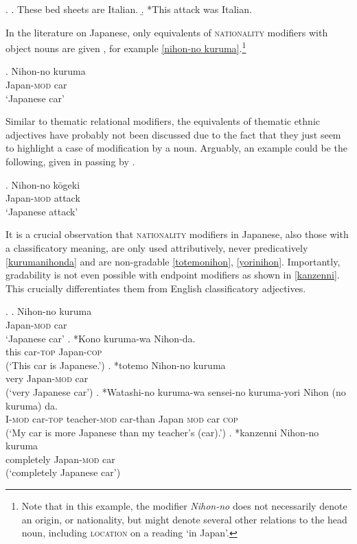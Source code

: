 \ex. \a. These bed sheets are Italian. \label{bedsheet}
\b. *This attack was Italian. \label{attack}

In the literature on Japanese, only equivalents of \textsc{nationality} modifiers with object nouns are given \citep{morita:2011:three, nagano:2016:are}, for example \ref{nihon-no kuruma}.\footnote{Note that in this example, the modifier \textit{Nihon-no} does not necessarily denote an origin, or nationality, but might denote several other relations to the head noun, including \textsc{location} on a reading `in Japan’.}

\exg. Nihon-no kuruma\\
Japan-\textsc{mod} car\\
`Japanese car' \label{nihon-no kuruma}

Similar to thematic relational modifiers, the equivalents of thematic ethnic adjectives have probably not been discussed due to the fact that they just seem to highlight a case of modification by a noun. Arguably, an example could be the following, given in passing by \citet[48]{nagano:2016:are}. 

\exg. Nihon-no kōgeki\\
Japan-\textsc{mod} attack\\
`Japanese attack'

\largerpage
It is a crucial observation that \textsc{nationality} modifiers in Japanese, also those with a classificatory meaning, are only used attributively, never predicatively \ref{kurumanihonda} and are non-gradable \ref{totemonihon}, \ref{yorinihon}. Importantly, gradability is not even possible with endpoint modifiers as shown in \ref{kanzenni}. This crucially differentiates them from  English classificatory adjectives.

\ex. \ag. Nihon-no kuruma\\
Japan-\textsc{mod} car\\
`Japanese car'
\bg. *Kono kuruma-wa Nihon-da.\\
this car-\textsc{top} Japan-\textsc{cop}\\
(`This car is Japanese.’) \label{kurumanihonda}
\cg. *totemo Nihon-no kuruma\\
very Japan-\textsc{mod} car\\
(`very Japanese car’) \label{totemonihon}
\dg. *Watashi-no kuruma-wa sensei-no kuruma-yori Nihon (no kuruma) da.\\
I-\textsc{mod} car-\textsc{top} teacher-\textsc{mod} car-than Japan \textsc{mod} car \textsc{cop}\\
(`My car is more Japanese than my teacher's (car).’) \label{yorinihon}
\eg. *kanzenni Nihon-no kuruma\\
completely Japan-\textsc{mod} car\\
(`completely Japanese car’) \label{kanzenni}

